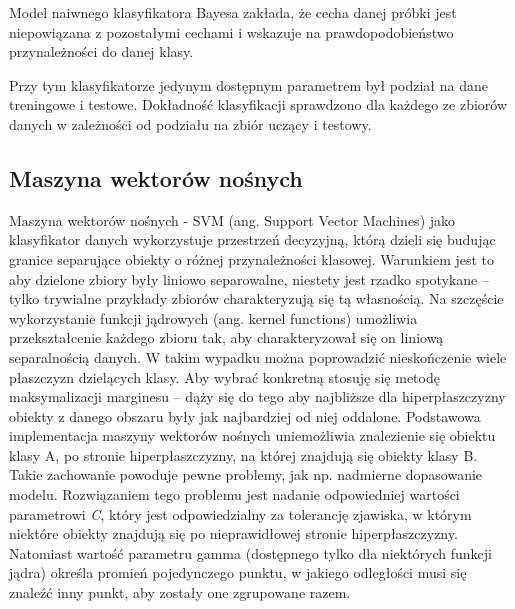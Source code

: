 \documentclass{classrep}
\begin{document}
{{            Model naiwnego klasyfikatora Bayesa zakłada, że cecha danej próbki jest niepowiązana z pozostałymi cechami i wskazuje na prawdopodobieństwo przynależności do danej klasy. 
            
            Przy tym klasyfikatorze jedynym dostępnym parametrem był podział na dane
            treningowe i testowe. Dokładność klasyfikacji sprawdzono dla każdego ze zbiorów danych w
            zależności od podziału na zbiór uczący i testowy.
        }

        \subsection{Maszyna wektorów nośnych}
        \label{svm_intro} {
        Maszyna wektorów nośnych - SVM (ang. Support Vector Machines) jako klasyfikator danych wykorzystuje przestrzeń decyzyjną, którą dzieli się budując granice separujące obiekty o różnej przynależności klasowej. Warunkiem jest to aby dzielone zbiory były liniowo separowalne, niestety jest rzadko spotykane -- tylko trywialne przykłady zbiorów charakteryzują się tą własnością. Na szczęście wykorzystanie funkcji jądrowych (ang. kernel functions) umożliwia przekształcenie każdego zbioru tak, aby charakteryzował się on liniową separalnością danych. W takim wypadku można poprowadzić nieskończenie wiele płaszczyzn dzielących klasy. Aby wybrać konkretną stosuję się metodę maksymalizacji marginesu -- dąży się do tego aby najbliższe dla hiperpłaszczyzny obiekty z danego obszaru były jak najbardziej od niej oddalone. Podstawowa implementacja maszyny wektorów nośnych uniemożliwia znalezienie się obiektu klasy A, po stronie hiperpłaszczyzny, na której znajdują się obiekty klasy B. Takie zachowanie powoduje pewne problemy, jak np. nadmierne dopasowanie modelu. Rozwiązaniem tego problemu jest nadanie odpowiedniej wartości parametrowi \emph{C}, który jest odpowiedzialny za tolerancję zjawiska, w którym niektóre obiekty znajdują się po nieprawidłowej stronie hiperpłaszczyzny. Natomiast wartość parametru gamma (dostępnego tylko dla niektórych funkcji jądra) określa promień pojedynczego punktu, w jakiego odległości musi się znaleźć inny punkt, aby zostały one zgrupowane razem.
        }

}
\end{document}
